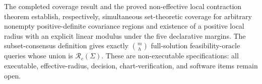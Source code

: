 The completed coverage result and the proved non-effective local contraction theorem establish, respectively, simultaneous set-theoretic coverage for arbitrary nonempty positive-definite covariance regions and existence of a positive local radius with an explicit linear modulus under the five declarative margins. The subset-consensus definition gives exactly \(\binom{m}{h}\) full-solution feasibility-oracle queries whose union is \(\mathcal R_c(\Sigma)\). These are non-executable specifications: all executable, effective-radius, decision, chart-verification, and software items remain open.